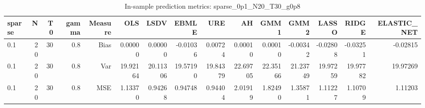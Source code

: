 \begin{table}[!htbp]\centering
\caption{In-sample prediction metrics: sparse_0p1_N20_T30_g0p8}
\label{tab:table2_sparse_0p1_N20_T30_g0p8}
\begin{tabular}{lrrrrrrrrrrrrrr}
\hline
sparse & N & T0 & gamma & Measure & OLS & LSDV & EBMLE & URE & AH & GMM1 & GMM2 & LASSO & RIDGE & ELASTIC_NET \\
\hline
0.1 & 20 & 30 & 0.8 & Bias & 0.00000 & 0.00000 & -0.01036 & 0.00724 & 0.00010 & 0.00010 & -0.00342 & -0.02808 & -0.03251 & -0.02815 \\
0.1 & 20 & 30 & 0.8 & Var & 19.92164 & 20.11306 & 19.57190 & 19.84379 & 22.69705 & 22.35166 & 21.23749 & 19.97259 & 19.97782 & 19.97269 \\
0.1 & 20 & 30 & 0.8 & MSE & 1.13370 & 0.94268 & 0.94748 & 0.94404 & 2.01919 & 1.82490 & 1.35871 & 1.11227 & 1.10709 & 1.11203 \\
\hline
\end{tabular}
\end{table}

